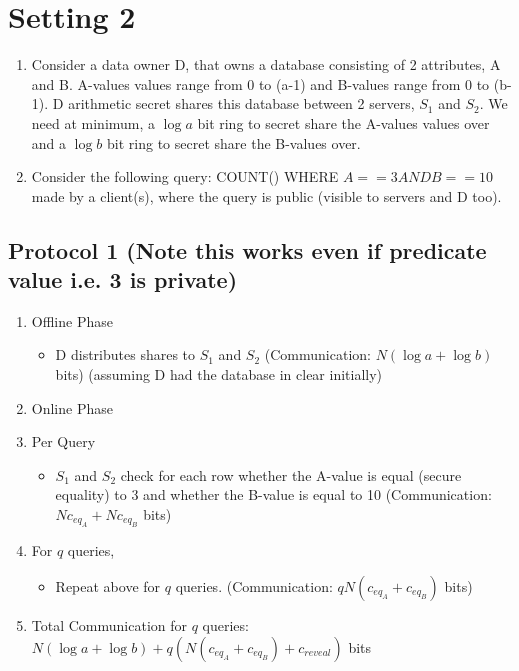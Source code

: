 \section{Setting 2}
\begin{enumerate}
    \item Consider a data owner D, that owns a database consisting of 2 attributes, A and B. A-values values range from 0 to (a-1) and B-values range from 0 to (b-1). D arithmetic secret shares this database between 2 servers, $S_1$ and $S_2$. We need at minimum, a $\log a$ bit ring to secret share the A-values values over and a $\log b$ bit ring to secret share the B-values over.
    \item Consider the following query: COUNT() WHERE $A == 3 AND B == 10$ made by a client(s), where the query is public (visible to servers and D too).
\end{enumerate}

\subsection{Protocol 1 (Note this works even if predicate value i.e. 3 is private)}
\begin{enumerate}
    \item Offline Phase
    \begin{itemize}
        \item D distributes shares to $S_1$ and $S_2$ (Communication: $N(\log a + \log b)$ bits) (assuming D had the database in clear initially)
    \end{itemize}
    \item Online Phase
    \item Per Query
    \begin{itemize}
        \item $S_1$ and $S_2$ check for each row whether the A-value is equal (secure equality) to 3 and whether the B-value is equal to 10 (Communication: $Nc_{eq_A} + Nc_{eq_B}$ bits)
    \end{itemize}
    \item For $q$ queries,
    \begin{itemize}
        \item Repeat above for $q$ queries. (Communication: $qN(c_{eq_A} + c_{eq_B})$ bits)
    \end{itemize}
    \item Total Communication for $q$ queries: $N(\log a + \log b) + q(N(c_{eq_A} + c_{eq_B}) + c_{reveal})$ bits
\end{enumerate}


